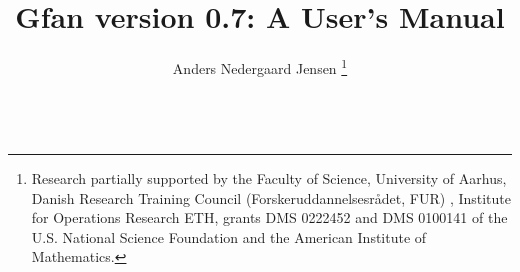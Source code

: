 

\def\name{Gfan }
\def\nameversion{gfan0.7}
\def\exename{gfan}




\title{\name version 0.7: A User's Manual}
\author{Anders Nedergaard Jensen
\thanks{Research partially supported by the Faculty of Science, University of Aarhus, Danish Research Training Council (Forskeruddannelsesr\aa det, FUR) , Institute for Operations Research ETH, grants DMS 0222452 and DMS 0100141 of the U.S. National Science Foundation and the American Institute of Mathematics.
}
\\
\\
}
\maketitle

